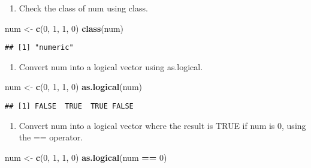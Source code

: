 \documentclass[]{article}
\newenvironment{Shaded}{\begin{snugshade}}{\end{snugshade}}
\newcommand{\DecValTok}[1]{\textcolor[rgb]{0.00,0.00,0.81}{#1}}
\newcommand{\KeywordTok}[1]{\textcolor[rgb]{0.13,0.29,0.53}{\textbf{#1}}}
\newcommand{\NormalTok}[1]{#1}
\newcommand{\OperatorTok}[1]{\textcolor[rgb]{0.81,0.36,0.00}{\textbf{#1}}}
\newcommand{\StringTok}[1]{\textcolor[rgb]{0.31,0.60,0.02}{#1}}
\providecommand{\tightlist}{%
  \setlength{\itemsep}{0pt}\setlength{\parskip}{0pt}}
\begin{document}
\begin{enumerate}
\def\labelenumi{\alph{enumi}.}
\setcounter{enumi}{1}
\tightlist
\item
  Check the class of num using class.
\end{enumerate}

\begin{Shaded}
\begin{Highlighting}[]
\NormalTok{num <-}\StringTok{ }\KeywordTok{c}\NormalTok{(}\DecValTok{0}\NormalTok{, }\DecValTok{1}\NormalTok{, }\DecValTok{1}\NormalTok{, }\DecValTok{0}\NormalTok{) }
\KeywordTok{class}\NormalTok{(num)}
\end{Highlighting}
\end{Shaded}

\begin{verbatim}
## [1] "numeric"
\end{verbatim}

\begin{enumerate}
\def\labelenumi{\alph{enumi}.}
\setcounter{enumi}{2}
\tightlist
\item
  Convert num into a logical vector using as.logical.
\end{enumerate}

\begin{Shaded}
\begin{Highlighting}[]
\NormalTok{num <-}\StringTok{ }\KeywordTok{c}\NormalTok{(}\DecValTok{0}\NormalTok{, }\DecValTok{1}\NormalTok{, }\DecValTok{1}\NormalTok{, }\DecValTok{0}\NormalTok{) }
\KeywordTok{as.logical}\NormalTok{(num)}
\end{Highlighting}
\end{Shaded}

\begin{verbatim}
## [1] FALSE  TRUE  TRUE FALSE
\end{verbatim}

\begin{enumerate}
\def\labelenumi{\alph{enumi}.}
\setcounter{enumi}{3}
\tightlist
\item
  Convert num into a logical vector where the result is TRUE if num is
  0, using the == operator.
\end{enumerate}

\begin{Shaded}
\begin{Highlighting}[]
\NormalTok{num <-}\StringTok{ }\KeywordTok{c}\NormalTok{(}\DecValTok{0}\NormalTok{, }\DecValTok{1}\NormalTok{, }\DecValTok{1}\NormalTok{, }\DecValTok{0}\NormalTok{) }
\KeywordTok{as.logical}\NormalTok{(num }\OperatorTok{==}\StringTok{ }\DecValTok{0}\NormalTok{)}
\end{Highlighting}
\end{Shaded}
\end{document}
